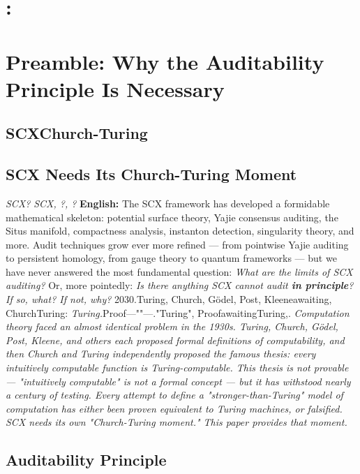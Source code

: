 \documentclass[12pt,a4paper]{article}
\theoremstyle{plain}
\theoremstyle{definition}
\theoremstyle{remark}
\begin{document}
\section{:}
\section{Preamble: Why the Auditability Principle Is Necessary}
\subsection{SCXChurch-Turing}
\subsection{SCX Needs Its Church-Turing Moment}
\textit{SCX?}
\textit{SCX\?, ?, ?}
\vspace{6pt}
\noindent
\textbf{English:} The SCX framework has developed a formidable mathematical skeleton: potential surface theory, Yajie consensus auditing, the Situs manifold, compactness analysis, instanton detection, singularity theory, and more. Audit techniques grow ever more refined --- from pointwise Yajie auditing to persistent homology, from gauge theory to quantum frameworks --- but we have never answered the most fundamental question:
\textit{What are the limits of SCX auditing?}
Or, more pointedly:
\textit{Is there anything SCX cannot audit \textbf{in principle}? If so, what? If not, why?}
\vspace{6pt}
2030.Turing, Church, G\"odel, Post, Kleeneawaiting, ChurchTuring: \textit{Turing.}Proof---""---."Turing", ProofawaitingTuring,.
\vspace{4pt}
\noindent
\textit{Computation theory faced an almost identical problem in the 1930s. Turing, Church, G\"odel, Post, Kleene, and others each proposed formal definitions of computability, and then Church and Turing independently proposed the famous thesis: every intuitively computable function is Turing-computable. This thesis is not provable --- "intuitively computable" is not a formal concept --- but it has withstood nearly a century of testing. Every attempt to define a "stronger-than-Turing" model of computation has either been proven equivalent to Turing machines, or falsified.}
\vspace{6pt}
\vspace{4pt}
\noindent
\textit{SCX needs its own "Church-Turing moment." This paper provides that moment.}
\subsection{Auditability Principle}
\end{document}

